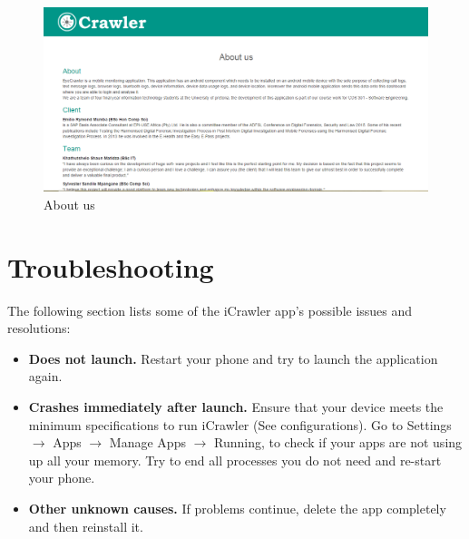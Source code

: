 \documentclass[hidelinks, 12pt, oneside]{article}
\begin{document}
\begin{itemize}
	 	 \begin{figure}[h!]
	 	 	\caption{About us}
	 	 	\centering 																																		\includegraphics[width=1 \textwidth]{img/dashboard/aboutUs.png}
	 	 \end{figure}\newpage	
	 	 
	 \end{itemize}
	
	\section{Troubleshooting}
	The following section lists some of the iCrawler app's possible issues and resolutions:
	
	\begin{itemize}
		\item \textbf{Does not launch.} Restart your phone and try to launch the application again.
		\item\textbf{Crashes immediately after launch.} Ensure that your device meets the minimum specifications to run
		 iCrawler (See configurations). Go to Settings $\rightarrow$ Apps $\rightarrow$ Manage Apps $\rightarrow$ Running, to check if your apps are not using up all
		  your memory. Try to end all processes you do not need and re-start your phone.
		\item \textbf{Other unknown causes.} If problems continue, delete the app completely and then reinstall it.\
	\end{itemize}
		
\end{document}
